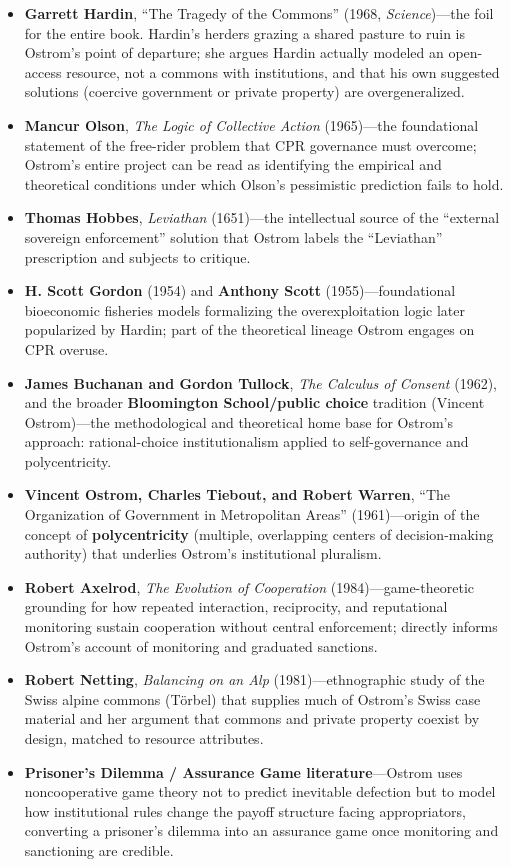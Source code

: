 \documentclass[12pt]{article}
\begin{document}
\begin{itemize}[leftmargin=*, itemsep=4pt]
    \item \textbf{Garrett Hardin}, ``The Tragedy of the Commons'' (1968, \textit{Science})---the foil for the entire book. Hardin's herders grazing a shared pasture to ruin is Ostrom's point of departure; she argues Hardin actually modeled an open-access resource, not a commons with institutions, and that his own suggested solutions (coercive government or private property) are overgeneralized.
    \item \textbf{Mancur Olson}, \textit{The Logic of Collective Action} (1965)---the foundational statement of the free-rider problem that CPR governance must overcome; Ostrom's entire project can be read as identifying the empirical and theoretical conditions under which Olson's pessimistic prediction fails to hold.
    \item \textbf{Thomas Hobbes}, \textit{Leviathan} (1651)---the intellectual source of the ``external sovereign enforcement'' solution that Ostrom labels the ``Leviathan'' prescription and subjects to critique.
    \item \textbf{H. Scott Gordon} (1954) and \textbf{Anthony Scott} (1955)---foundational bioeconomic fisheries models formalizing the overexploitation logic later popularized by Hardin; part of the theoretical lineage Ostrom engages on CPR overuse.
    \item \textbf{James Buchanan and Gordon Tullock}, \textit{The Calculus of Consent} (1962), and the broader \textbf{Bloomington School/public choice} tradition (Vincent Ostrom)---the methodological and theoretical home base for Ostrom's approach: rational-choice institutionalism applied to self-governance and polycentricity.
    \item \textbf{Vincent Ostrom, Charles Tiebout, and Robert Warren}, ``The Organization of Government in Metropolitan Areas'' (1961)---origin of the concept of \textbf{polycentricity} (multiple, overlapping centers of decision-making authority) that underlies Ostrom's institutional pluralism.
    \item \textbf{Robert Axelrod}, \textit{The Evolution of Cooperation} (1984)---game-theoretic grounding for how repeated interaction, reciprocity, and reputational monitoring sustain cooperation without central enforcement; directly informs Ostrom's account of monitoring and graduated sanctions.
    \item \textbf{Robert Netting}, \textit{Balancing on an Alp} (1981)---ethnographic study of the Swiss alpine commons (Törbel) that supplies much of Ostrom's Swiss case material and her argument that commons and private property coexist by design, matched to resource attributes.
    \item \textbf{Prisoner's Dilemma / Assurance Game literature}---Ostrom uses noncooperative game theory not to predict inevitable defection but to model how institutional rules change the payoff structure facing appropriators, converting a prisoner's dilemma into an assurance game once monitoring and sanctioning are credible.
\end{itemize}
\end{document}
